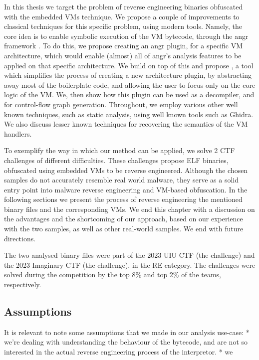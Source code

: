 In this thesis we target the problem of reverse engineering binaries obfuscated with the embedded \glspl{VM} technique. We propose a couple of improvements to classical techniques for this specific problem, using modern tools. Namely, the core idea is to enable symbolic execution of the VM bytecode, through the angr framework \cite{TODO}. To do this, we propose creating an angr plugin, for a specific VM architecture, which would enable (almost) all of angr's analysis features to be applied on that specific architecture. We build on top of this and propose , a tool which simplifies the process of creating a new architecture plugin, by abstracting away most of the boilerplate code, and allowing the user to focus only on the core logic of the \gls{VM}. We, then show how this plugin can be used as a decompiler, and for control-flow graph generation. Throughout, we employ various other well known techniques, such as static analysis, using well known tools such as Ghidra. We also discuss lesser known techniques for recovering the semantics of the \gls{VM} handlers.

To exemplify the way in which our method can be applied, we solve 2 \gls{CTF} challenges of different difficulties. These challenges propose \gls{ELF} binaries, obfuscated using embedded \glspl{VM} to be reverse engineered. Although the chosen samples do not accurately resemble real world malware, they serve as a solid entry point into malware reverse engineering and \gls{VM}-based obfuscation. In the following sections we present the process of reverse engineering the mentioned binary files and the corresponding \glspl{VM}. We end this chapter with a discussion on the advantages and the shortcoming of our approach, based on our experience with the two samples, as well as other real-world samples. We end with future directions.

The two analysed binary files were part of the 2023 UIU CTF (the  challenge) \cite{TODO} and the 2023 Imaginary CTF (the  challenge), in the \gls{RE} category. The challenges were solved during the competition by the top 8\% and top 2\% of the teams, respectively.

\subsection{Assumptions}

It is relevant to note some assumptions that we made in our analysis use-case:
* we're dealing with understanding the behaviour of the bytecode, and are not so
interested in the actual reverse engineering process of the interpretor. * we


